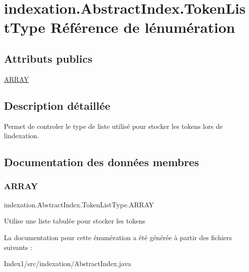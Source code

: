 \hypertarget{enumindexation_1_1AbstractIndex_1_1TokenListType}{}\section{indexation.\+Abstract\+Index.\+Token\+List\+Type Référence de l\textquotesingle{}énumération}
\label{enumindexation_1_1AbstractIndex_1_1TokenListType}
\subsection*{Attributs publics}
\begin{DoxyCompactItemize}
\item 
\hyperlink{enumindexation_1_1AbstractIndex_1_1TokenListType_a1168dde9df68e4cdfab13bec26abdf33}{A\+R\+R\+AY}
\end{DoxyCompactItemize}


\subsection{Description détaillée}
Permet de controler le type de liste utilisé pour stocker les tokens lors de l\textquotesingle{}indexation. 

\subsection{Documentation des données membres}
\mbox{\label{enumindexation_1_1AbstractIndex_1_1TokenListType_a1168dde9df68e4cdfab13bec26abdf33}} 
\subsubsection{\texorpdfstring{A\+R\+R\+AY}{ARRAY}}
{\footnotesize\ttfamily indexation.\+Abstract\+Index.\+Token\+List\+Type.\+A\+R\+R\+AY}

Utilise une liste tabulée pour stocker les tokens 

La documentation pour cette énumération a été générée à partir des fichiers suivants \+:\begin{DoxyCompactItemize}
\item 
Index1/src/indexation/Abstract\+Index.\+java\end{DoxyCompactItemize}
